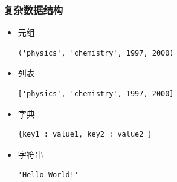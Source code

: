 \documentclass[11pt]{beamer}
\begin{document}
\begin{frame}[fragile]
	\frametitle{复杂数据结构}
		\begin{itemize}
			\item 元组
			\begin{lstlisting}[numbers=none]
('physics', 'chemistry', 1997, 2000)
\end{lstlisting}
			\item 列表
			\begin{lstlisting}[numbers=none]
['physics', 'chemistry', 1997, 2000]
\end{lstlisting}
			\item 字典
			\begin{lstlisting}[numbers=none]
{key1 : value1, key2 : value2 }
\end{lstlisting}
			\item 字符串
			\begin{lstlisting}[numbers=none]
'Hello World!'
\end{lstlisting}
		\end{itemize}
\end{frame}

%			
\end{document}
